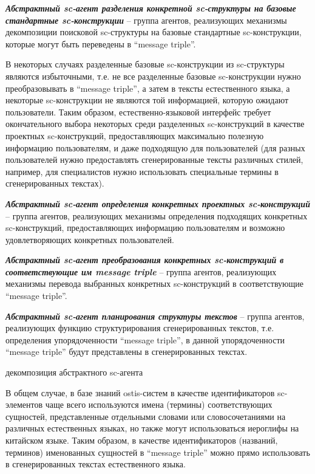 \textit{\textbf{Абстрактный sc-агент разделения конкретной sc-структуры на базовые стандартные sc-конструкции}} -- группа агентов, реализующих механизмы декомпозиции поисковой sc-структуры на базовые стандартные sc-конструкции, которые могут быть переведены в ``message triple''. 

В некоторых случаях разделенные базовые sc-конструкции из sc-структуры являются избыточными, т.е. не все разделенные базовые sc-конструкции нужно преобразовывать в ``message triple'', а затем в тексты естественного языка, а некоторые sc-конструкции не являются той информацией, которую ожидают пользователи. Таким образом, естественно-языковой интерфейс требует окончательного выбора некоторых среди разделенных sc-конструкций в качестве проектных sc-конструкций, предоставляющих максимально полезную информацию пользователям, и даже подходящую для пользователей (для разных пользователей нужно предоставлять сгенерированные тексты различных стилей, например, для специалистов нужно использовать специальные термины в сгенерированных текстах). 

\textit{\textbf{Абстрактный sc-агент определения конкретных проектных sc-конструкций}} -- группа агентов, реализующих механизмы определения подходящих конкретных sc-конструкций, предоставляющих информацию пользователям и возможно удовлетворяющих конкретных пользователей. 

\textit{\textbf{Абстрактный sc-агент преобразования конкретных sc-конструкций в соответствующие им message triple}} -- группа агентов, реализующих механизмы перевода выбранных конкретных sc-конструкций в соответствующие ``message triple''.

\textit{\textbf{Абстрактный sc-агент планирования структуры текстов}} -- группа агентов, реализующих функцию структурирования сгенерированных текстов, т.е. определения упорядоченности ``message triple'', в данной упорядоченности ``message triple'' будут представлены в сгенерированных текстах. 
\begin{SCn}
	\begin{scnrelfromset}{декомпозиция абстрактного sc-агента}
	\end{scnrelfromset}
\end{SCn}

В общем случае, в базе знаний ostis-систем в качестве идентификаторов sc-элементов чаще всего используются имена (термины) соответствующих сущностей, представленные отдельными словами или словосочетаниями на различных естественных языках, но также могут использоваться иероглифы на китайском языке. Таким образом, в качестве идентификаторов (названий, терминов) именованных сущностей в ``message triple'' можно прямо использовать в сгенерированных текстах естественного языка. 


